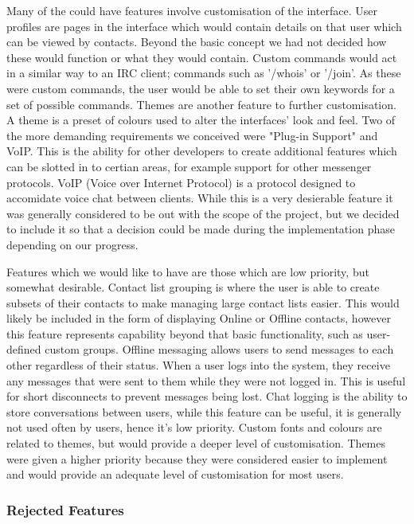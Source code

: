 Many of the could have features involve customisation of the interface. User profiles are pages in the interface which would contain details on that user which can be viewed by contacts. Beyond the basic concept we had not decided how these would function or what they would contain. Custom commands would act in a similar way to an IRC client; commands such as '/whois' or '/join'. As these were custom commands, the user would be able to set their own keywords for a set of possible commands. Themes are another feature to further customisation. A theme is a preset of colours used to alter the interfaces' look and feel. Two of the more demanding requirements we conceived were "Plug-in Support" and VoIP. This is the ability for other developers to create additional features which can be slotted in to certian areas, for example support for other messenger protocols. VoIP (Voice over Internet Protocol) is a protocol designed to accomidate voice chat between clients. While this is a very desierable feature it was generally considered to be out with the scope of the project, but we decided to include it so that a decision could be made during the implementation phase depending on our progress.

Features which we would like to have are those which are low priority, but somewhat desirable. Contact list grouping is where the user is able to create subsets of their contacts to make managing large contact lists easier. This would likely be included in the form of displaying Online or Offline contacts, however this feature represents capability beyond that basic functionality, such as user-defined custom groups. Offline messaging allows users to send messages to each other regardless of their status. When a user logs into the system, they receive any messages that were sent to them while they were not logged in. This is useful for short disconnects to prevent messages being lost. Chat logging is the ability to store conversations between users, while this feature can be useful, it is generally not used often by users, hence it's low priority. Custom fonts and colours are related to themes, but would provide a deeper level of customisation. Themes were given a higher priority because they were considered easier to implement and would provide an adequate level of customisation for most users.


\subsubsection{Rejected Features}

